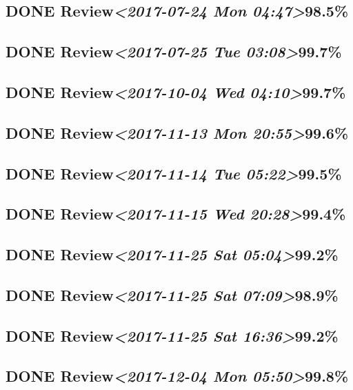 \documentclass[11pt]{ctexart}
\begin{document}
\subsection{{\bfseries\sffamily DONE} Review\textit{<2017-07-24 Mon 04:47>}98.5\%}
\label{sec:org024775b}
\subsection{{\bfseries\sffamily DONE} Review\textit{<2017-07-25 Tue 03:08>}99.7\%}
\label{sec:orgd961d81}
\subsection{{\bfseries\sffamily DONE} Review\textit{<2017-10-04 Wed 04:10>}99.7\%}
\label{sec:org1227d87}

\subsection{{\bfseries\sffamily DONE} Review\textit{<2017-11-13 Mon 20:55>}99.6\%}
\label{sec:orgbe56534}
\subsection{{\bfseries\sffamily DONE} Review\textit{<2017-11-14 Tue 05:22>}99.5\%}
\label{sec:org1ed798e}
\subsection{{\bfseries\sffamily DONE} Review\textit{<2017-11-15 Wed 20:28>}99.4\%}
\label{sec:org0071d68}
\subsection{{\bfseries\sffamily DONE} Review\textit{<2017-11-25 Sat 05:04>}99.2\%}
\label{sec:org3118acd}
\subsection{{\bfseries\sffamily DONE} Review\textit{<2017-11-25 Sat 07:09>}98.9\%}
\label{sec:orgf53335c}
\subsection{{\bfseries\sffamily DONE} Review\textit{<2017-11-25 Sat 16:36>}99.2\%}
\label{sec:org605038a}
\subsection{{\bfseries\sffamily DONE} Review\textit{<2017-12-04 Mon 05:50>}99.8\%}
\label{sec:org48bfa74}
\end{document}
